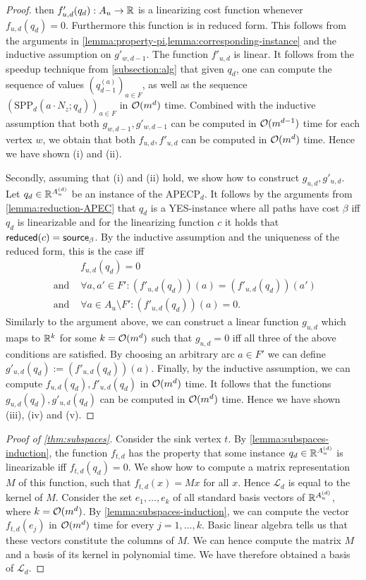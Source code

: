 \begin{proof}
    then $f'_{u,d}(q_d) : A_u \rightarrow \mathbb{R}$ is a linearizing cost function whenever $f_{u,d}(q_d) = 0$. Furthermore this function is in reduced form. This follows from the arguments in \cref{lemma:property-pi,lemma:corresponding-instance} and the inductive assumption on $g'_{w,d-1}$. 
    The function $f'_{u,d}$ is linear. 
    It follows from the speedup technique from \cref{subsection:alg} that given $q_d$, one can compute the sequence of values $(q^{(a)}_{d-1})_{a \in F}$, as well as the sequence $(\text{SPP}_d(a \cdot N_z; q_d))_{a\in F}$ in $\mathcal{O}(m^d)$ time. 
    Combined with the inductive assumption that both $g_{w,d-1}, g'_{w,d-1}$ can be computed in $\mathcal{O}(m^{d-1})$ time for each vertex $w$, we obtain that both $f_{u,d}, f'_{u,d}$ can be computed in $\mathcal{O}(m^d)$ time. Hence we have shown (i) and (ii).

    Secondly, assuming that (i) and (ii) hold, we show how to construct $g_{u,d}, g'_{u,d}$. Let $q_d \in \mathbb{R}^{A_u^{(d)}}$ be an instance of the APECP$_d$. It follows by the arguments from \cref{lemma:reduction-APEC} that $q_d$ is a YES-instance where all paths have cost $\beta$ iff $q_d$ is linearizable and for the linearizing function $c$ it holds that $\operatorname{\textsf{reduced}}(c) = \textsf{source}_\beta$. By the inductive assumption and the uniqueness of the reduced form, this is the case iff 
    \begin{align*}
        &f_{u,d}(q_d) = 0 \\
        \text{ and } &\forall a,a' \in F':  (f'_{u,d}(q_d))(a) = (f'_{u,d}(q_d))(a') \\
        \text{ and } &\forall a \in A_u \setminus F': (f'_{u,d}(q_d))(a) = 0. 
    \end{align*}
    Similarly to the argument above, we can construct a linear function $g_{u,d}$ which maps to $\mathbb{R}^k$ for some $k = \mathcal{O}(m^d)$ such that $g_{u,d} = 0$ iff all three of the above conditions are satisfied. By choosing an arbitrary arc $a \in F'$ we can define $g'_{u,d}(q_d) := (f'_{u,d}(q_d))(a)$. Finally, by the inductive assumption, we can compute $f_{u,d}(q_d), f'_{u,d}(q_d)$ in $\mathcal{O}(m^d)$ time. It follows that the functions $g_{u,d}(q_d), g'_{u,d}(q_d)$ can be computed in $\mathcal{O}(m^d)$ time. Hence we have shown (iii), (iv) and (v).  
\end{proof}

\begin{proof}[Proof of \cref{thm:subspaces}]
    Consider the sink vertex $t$. By \cref{lemma:subspaces-induction}, the function $f_{t,d}$ has the property that some instance $q_d \in \mathbb{R}^{A_u^{(d)}}$ is linearizable iff $f_{t,d}(q_d) = 0$. 
    We show how to compute a matrix representation $M$ of this function, such that $f_{t,d}(x) = Mx$ for all $x$. Hence $\mathcal{L}_d$ is equal to the kernel of $M$.
    Consider the set $e_1,\dots, e_k$ of all standard basis vectors of $\mathbb{R}^{A_u^{(d)}}$, where $k = \mathcal{O}(m^d)$. By \cref{lemma:subspaces-induction}, we can compute the vector $f_{t,d}(e_j)$ in $\mathcal{O}(m^d)$ time for every $j=1,\dots,k$. Basic linear algebra tells us that these vectors constitute the columns of $M$. We can hence compute the matrix $M$ and a basis of its kernel in polynomial time. We have therefore obtained a basis of $\mathcal{L}_d$.  
\end{proof}